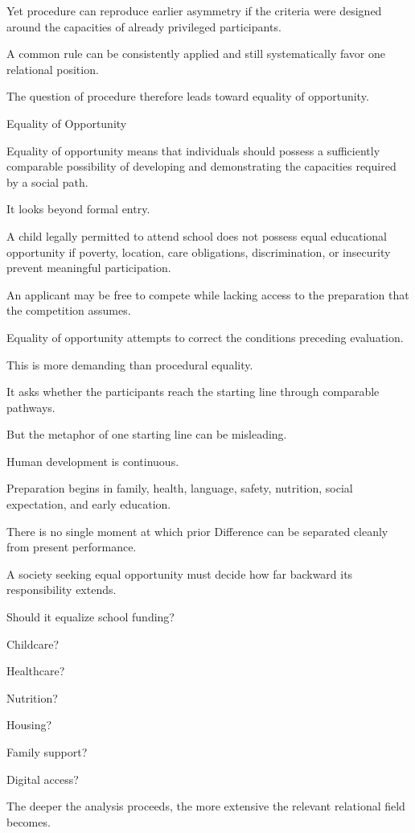 Yet procedure can reproduce earlier asymmetry if the criteria were designed around the capacities of already privileged participants.

A common rule can be consistently applied and still systematically favor one relational position.

The question of procedure therefore leads toward equality of opportunity.

Equality of Opportunity

Equality of opportunity means that individuals should possess a sufficiently comparable possibility of developing and demonstrating the capacities required by a social path.

It looks beyond formal entry.

A child legally permitted to attend school does not possess equal educational opportunity if poverty, location, care obligations, discrimination, or insecurity prevent meaningful participation.

An applicant may be free to compete while lacking access to the preparation that the competition assumes.

Equality of opportunity attempts to correct the conditions preceding evaluation.

This is more demanding than procedural equality.

It asks whether the participants reach the starting line through comparable pathways.

But the metaphor of one starting line can be misleading.

Human development is continuous.

Preparation begins in family, health, language, safety, nutrition, social expectation, and early education.

There is no single moment at which prior Difference can be separated cleanly from present performance.

A society seeking equal opportunity must decide how far backward its responsibility extends.

Should it equalize school funding?

Childcare?

Healthcare?

Nutrition?

Housing?

Family support?

Digital access?

The deeper the analysis proceeds, the more extensive the relevant relational field becomes.

